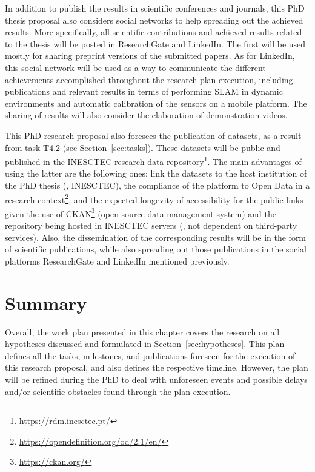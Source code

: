 In addition to publish the results in scientific conferences and journals, this PhD thesis proposal also considers social networks to help spreading out the achieved results.
More specifically, all scientific contributions and achieved results related to the thesis will be posted in ResearchGate and LinkedIn. The first will be used mostly for sharing preprint versions of the submitted papers. As for LinkedIn, this social network will be used as a way to communicate the different achievements accomplished throughout the research plan execution, including publications and relevant results in terms of performing \gls{SLAM} in dynamic environments and automatic calibration of the sensors on a mobile platform. The sharing of results will also consider the elaboration of demonstration videos.

This PhD research proposal also foresees the publication of datasets, as a result from task T4.2 (see Section~\ref{sec:tasks}).
These datasets will be public and published in the \gls{INESCTEC} research data repository\footnote{\url{https://rdm.inesctec.pt/}}. The main advantages of using the latter are the following ones: link the datasets to the host institution of the PhD thesis (\ie, \gls{INESCTEC}), the compliance of the platform to Open Data in a research context\footnote{\url{https://opendefinition.org/od/2.1/en/}}, and the expected longevity of accessibility for the public links given the use of CKAN\footnote{\url{https://ckan.org/}} (open source data management system) and the repository being hosted in \gls{INESCTEC} servers (\ie, not dependent on third-party services).
Also, the dissemination of the corresponding results will be in the form of scientific publications, while also spreading out those publications in the social platforms ResearchGate and LinkedIn mentioned previously.






\section{Summary}

Overall, the work plan presented in this chapter covers the research on all hypotheses discussed and formulated in Section~\ref{sec:hypotheses}. This plan defines all the tasks, milestones, and publications foreseen for the execution of this research proposal, and also defines the respective timeline. However, the plan will be refined during the PhD to deal with unforeseen events and possible delays and/or scientific obstacles found through the plan execution.
